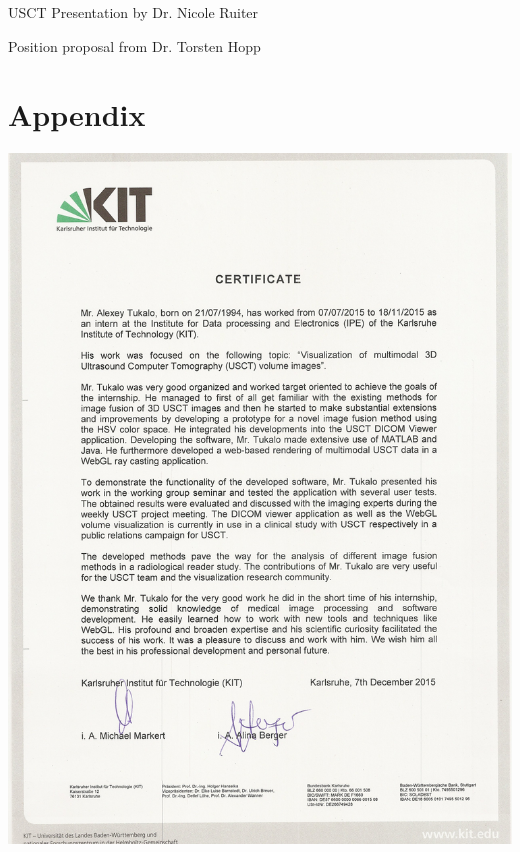 \documentclass[english]{article}
\begin{document}
\begin{thebibliography}{1}

    USCT Presentation by Dr. Nicole Ruiter
   
    Position proposal from Dr. Torsten Hopp

\end{thebibliography}

\section{Appendix}
\includegraphics[scale=0.75]{internship_report/certificate}

\end{document}
